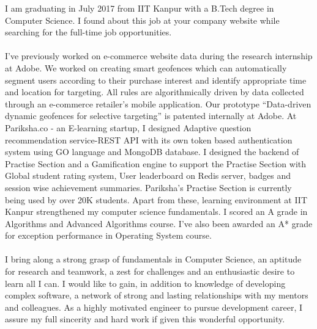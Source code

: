 I am graduating in July 2017 from IIT Kanpur with a B.Tech degree in Computer Science. I found about this job at your company website while searching for the full-time job opportunities. 
\\
\\
I've previously worked on e-commerce website data during the research internship at Adobe. We worked on creating smart geofences which can automatically segment users according to their purchase interest and identify appropriate time and location for targeting. All rules are algorithmically driven by data collected through an e-commerce retailer’s mobile application. Our prototype ``Data-driven dynamic geofences for selective targeting'' is patented internally at Adobe. 
At Pariksha.co - an E-learning startup, I designed Adaptive question recommendation service-REST API with its own token based authentication system using GO language and MongoDB database. I designed the backend of Practise Section and a Gamification engine to support the Practise Section with Global student rating system, User leaderboard on Redis server, badges and session wise achievement summaries. Pariksha's Practise Section is currently being used by over 20K students. Apart from these, learning environment at IIT Kanpur strengthened my computer science fundamentals. I scored an A grade in Algorithms and Advanced Algorithms course. I've also been awarded an A* grade for exception performance in Operating System course. 
\\
\\
I bring along a strong grasp of fundamentals in Computer Science, an aptitude for research and teamwork, a zest for challenges and an enthusiastic desire to learn all I can. I would like to gain, in addition to knowledge of developing complex software, a network of strong and lasting relationships with my mentors and colleagues. As a highly motivated engineer to pursue development career, I assure my full sincerity and hard work if given this wonderful opportunity. 